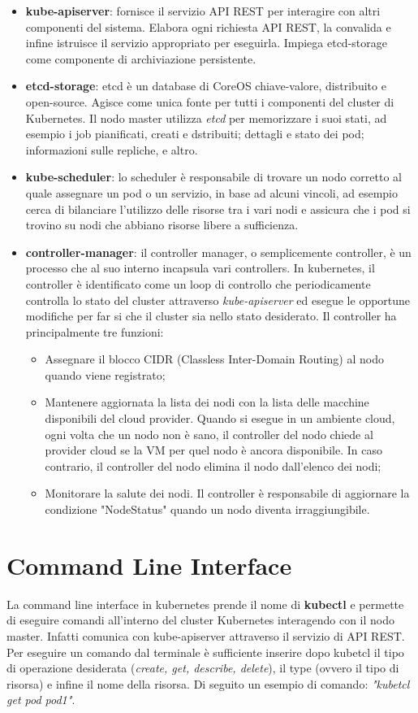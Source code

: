 \documentclass[12pt, a4paper]{report}
\begin{document}
\begin{itemize}
  \item \textbf{kube-apiserver}: fornisce il servizio API REST per interagire con altri componenti del sistema. Elabora ogni richiesta API REST, la convalida e infine istruisce il servizio appropriato per eseguirla. Impiega etcd-storage come componente di archiviazione persistente.
  \item \textbf{etcd-storage}: etcd è un database di CoreOS chiave-valore, distribuito e open-source. Agisce come unica fonte per tutti i componenti del cluster di Kubernetes. Il nodo master utilizza \textit{etcd} per memorizzare i suoi stati, ad esempio i job pianificati, creati e dstribuiti; dettagli e stato dei pod; informazioni sulle repliche, e altro.
  \item \textbf{kube-scheduler}: lo scheduler è responsabile di trovare un nodo corretto al quale assegnare un pod o un servizio, in base ad alcuni vincoli, ad esempio cerca di bilanciare l'utilizzo delle risorse tra i vari nodi e assicura che i pod si trovino su nodi che abbiano risorse libere a sufficienza.
  \item \textbf{controller-manager}: il controller manager, o semplicemente controller, è un processo che al suo interno incapsula vari controllers. In kubernetes, il controller è identificato come un loop di controllo che periodicamente controlla lo stato del cluster attraverso \textit{kube-apiserver} ed esegue le opportune modifiche per far si che il cluster sia nello stato desiderato. Il controller ha principalmente tre funzioni:
  \begin{itemize}
    \item Assegnare il blocco CIDR (Classless Inter-Domain Routing) al nodo quando viene registrato;
    \item Mantenere aggiornata la lista dei nodi con la lista delle macchine disponibili del cloud provider. Quando si esegue in un ambiente cloud, ogni volta che un nodo non è sano, il controller del nodo chiede al provider cloud se la VM per quel nodo è ancora disponibile. In caso contrario, il controller del nodo elimina il nodo dall'elenco dei nodi;
    \item Monitorare la salute dei nodi. Il controller è responsabile di aggiornare la condizione "NodeStatus" quando un nodo diventa irraggiungibile.
  \end{itemize}
\end{itemize}
\section{Command Line Interface}
La command line interface in kubernetes prende il nome di \textbf{kubectl} e permette di eseguire comandi all'interno del cluster Kubernetes interagendo con il nodo master. Infatti comunica con kube-apiserver attraverso il servizio di API REST. Per eseguire un comando dal terminale è sufficiente inserire dopo kubetcl il tipo di operazione desiderata (\textit{create, get, describe, delete}), il type (ovvero il tipo di risorsa) e infine il nome della risorsa. Di seguito un esempio di comando: \textit{"kubetcl get pod pod1"}.
\end{document}
